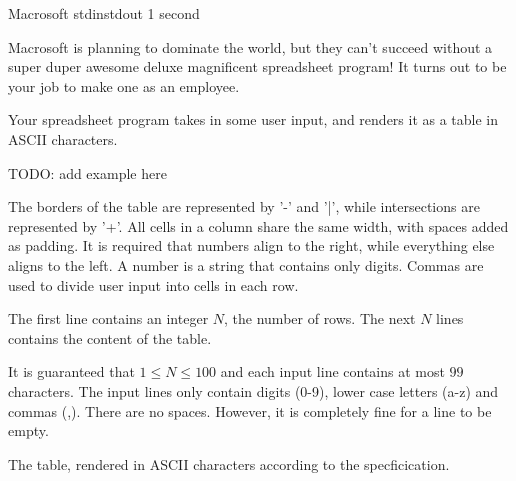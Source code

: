 \begin{problem}{Macrosoft}
{stdin}{stdout}
{1 second}{}{}

Macrosoft is planning to dominate the world, but they can't succeed without 
a super duper awesome deluxe magnificent spreadsheet program! It turns out to be your job to
make one as an employee. 

Your spreadsheet program takes in some user input, and renders it as a table in ASCII characters. 
\begin{center}
TODO: add example here
\end{center}
The borders of the table are represented by '-' and '|', while intersections are represented by '+'. All cells in a column share the same width, with spaces added as padding. It is required that numbers align to the right, while everything else aligns to the left. A number is a string that contains only digits. Commas are used to divide user input into cells in each row. 

\InputFile

The first line contains an integer $N$, the number of rows.
The next $N$ lines contains the content of the table. 

It is guaranteed that $1 \leq N \leq 100$ and each input line contains at most $99$ characters. 
The input lines only contain digits (0-9), lower case letters (a-z) and commas (,). There are no spaces. However, it is completely fine for a line to be empty.

\OutputFile

The table, rendered in ASCII characters according to the specficication.

\Examples

\begin{example}
%
%
%
\end{example}
\end{problem}
